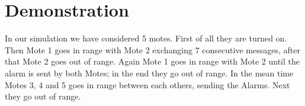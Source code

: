 \documentclass[12pt]{article}
\begin{document}
\section{Demonstration}
In our simulation we have considered 5 motes. First of all they are turned on. Then Mote 1 goes in range with Mote 2 exchanging 7 consecutive messages, after that Mote 2 goes out of range. Again Mote 1 goes in range with Mote 2 until the alarm is sent by both Motes; in the end they go out of range. In the mean time Motes 3, 4 and 5 goes in range between each others, sending the Alarms. Next they go out of range.
\end{document}
